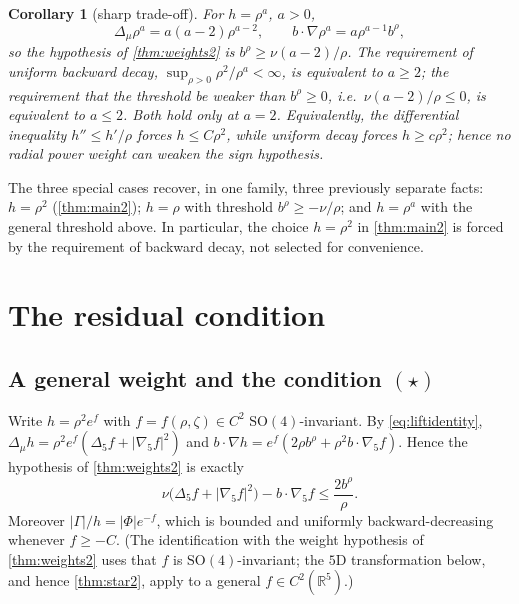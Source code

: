 \documentclass[11pt]{article}
\newtheorem{corollary}[theorem]{Corollary}
\theoremstyle{definition}
\newcommand{\R}{\mathbb{R}}
\begin{document}
\begin{corollary}[sharp trade-off]\label{cor:tradeoff}
For $h=\rho^a$, $a>0$,
\begin{equation}
\Delta_\mu\rho^a=a(a-2)\rho^{a-2},\qquad
b\cdot\nabla\rho^a=a\rho^{a-1}b^\rho,
\end{equation}
so the hypothesis of \cref{thm:weights2} is
$b^\rho\ge\nu(a-2)/\rho$. The requirement of uniform backward decay,
$\sup_{\rho>0}\rho^2/\rho^a<\infty$, is equivalent to $a\ge2$; the
requirement that the threshold be weaker than $b^\rho\ge0$, i.e.\
$\nu(a-2)/\rho\le0$, is equivalent to $a\le2$. Both hold only at $a=2$.
Equivalently, the differential inequality $h''\le h'/\rho$ forces
$h\le C\rho^2$, while uniform decay forces $h\ge c\rho^2$; hence
\emph{no radial power weight can weaken the sign hypothesis}.
\end{corollary}

The three special cases recover, in one family, three previously separate
facts: $h=\rho^2$ (\cref{thm:main2}); $h=\rho$ with threshold
$b^\rho\ge-\nu/\rho$; and $h=\rho^a$ with the general threshold above.
In particular, the choice $h=\rho^2$ in \cref{thm:main2} is forced by the
requirement of backward decay, not selected for convenience.

\section{The residual condition}

\subsection{A general weight and the condition $(\star)$}
Write $h=\rho^2e^f$ with $f=f(\rho,\zeta)\in C^2$ $\mathrm{SO}(4)$-invariant.
By \eqref{eq:liftidentity},
$\Delta_\mu h=\rho^2e^f(\Delta_5f+|\nabla_5f|^2)$ and
$b\cdot\nabla h=e^f(2\rho b^\rho+\rho^2b\cdot\nabla_5f)$. Hence the
hypothesis of \cref{thm:weights2} is exactly
\begin{equation}\label{eq:star2}
\nu\bigl(\Delta_5f+|\nabla_5f|^2\bigr)-b\cdot\nabla_5f\le\frac{2b^\rho}{\rho}.
\end{equation}
Moreover $|\Gamma|/h=|\Phi|e^{-f}$, which is bounded and uniformly
backward-decreasing whenever $f\ge-C$. (The identification with the weight
hypothesis of \cref{thm:weights2} uses that $f$ is $\mathrm{SO}(4)$-invariant;
the $5$D transformation below, and hence \cref{thm:star2}, apply to a general
$f\in C^2(\R^5)$.)
\end{document}
